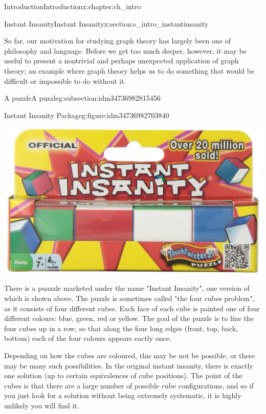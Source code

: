\documentclass[oneside,10pt,]{book}
\numberwithin{equation}{section}
\begin{document}
\begin{chapterptx}{Introduction}{}{Introduction}{}{}{x:chapter:ch_intro}
\begin{sectionptx}{Instant Insanity}{}{Instant Insanity}{}{}{x:section:s_intro_instantinsanity}
\begin{introduction}{}%
So far, our motivation for studying graph theory has largely been one of philosophy and language.  Before we get too much deeper, however, it may be useful to present a nontrivial and perhaps unexpected application of graph theory; an example where graph theory helps us to do something that would be difficult or impossible to do without it.%
\end{introduction}%
%
%
\typeout{************************************************}
\typeout{************************************************}
%
\begin{subsectionptx}{A puzzle}{}{A puzzle}{}{}{g:subsection:idm34736982815456}
\begin{figureptx}{Instant Insanity Package}{g:figure:idm34736982703840}{}%
\begin{image}{0.1}{0.8}{0.1}%
\includegraphics[width=\linewidth]{images/InstantInsanityPackage.JPG}
\end{image}%
\tcblower
\end{figureptx}%
There is a puazzle marketed under the name "Instant Insanity", one version of which is shown above.  The puzzle is sometimes called "the four cubes problem", as it consists of four different cubes.   Each face of each cube is painted one of four different colours: blue, green, red or yellow. The goal of the puzzle is to line the four cubes up in a row, so that along the four long edges (front, top, back, bottom) each of the four colours appears eactly once.%
\par
Depending on how the cubes are coloured, this may be not be possible, or there may be many such possibilities. In the original instant insanity, there is exactly one solution (up to certain equivalences of cube positions).  The point of the cubes is that there are a large number of possible cube configurations, and so if you just look for a solution without being extremely systematic, it is highly unlikely you will find it.%

\end{subsectionptx}
\end{sectionptx}
\end{chapterptx}
\end{document}
